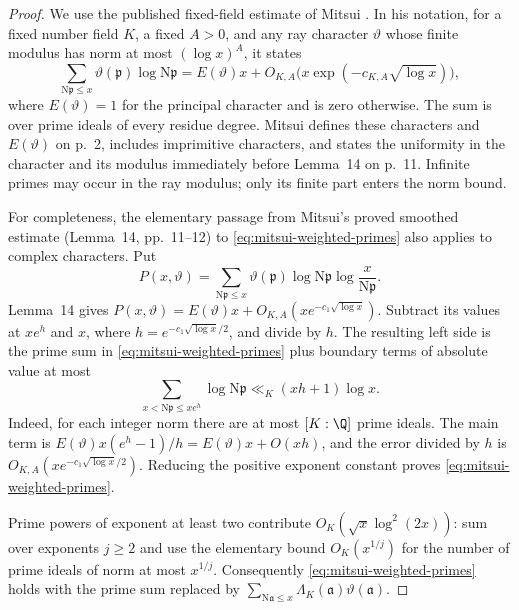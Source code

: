 \begin{proof}
We use the published fixed-field estimate of Mitsui
\cite[\S1, Lemma~15, p.~12]{Mitsui1956}.
In his notation, for a fixed number field $K$, a fixed $A>0$, and any
ray character $\vartheta$ whose finite modulus has norm at most
$(\log x)^A$, it states
\begin{equation}\label{eq:mitsui-weighted-primes}
 \sum_{\mathrm N\mathfrak p\leq x}
       \vartheta(\mathfrak p)\log\mathrm N\mathfrak p
 =E(\vartheta)x+
 O_{K,A}\bigl(x\exp(-c_{K,A}\sqrt{\log x})\bigr),
\end{equation}
where $E(\vartheta)=1$ for the principal character and is zero otherwise.
The sum is over prime ideals of every residue degree.
Mitsui defines these characters and $E(\vartheta)$ on p.~2, includes
imprimitive characters, and states the uniformity in the character
and its modulus immediately before Lemma~14 on p.~11.
Infinite primes may occur in the ray modulus; only its finite part
enters the norm bound.

For completeness, the elementary passage from Mitsui's proved
smoothed estimate (Lemma~14, pp.~11--12) to
\eqref{eq:mitsui-weighted-primes} also applies to complex characters.
Put
\[
 P(x,\vartheta)=\sum_{\mathrm N\mathfrak p\leq x}
  \vartheta(\mathfrak p)\log\mathrm N\mathfrak p
                         \log\frac{x}{\mathrm N\mathfrak p}.
\]
Lemma~14 gives $P(x,\vartheta)=E(\vartheta)x+
O_{K,A}(xe^{-c_1\sqrt{\log x}})$.
Subtract its values at $xe^h$ and $x$, where
$h=e^{-c_1\sqrt{\log x}/2}$, and divide by $h$.
The resulting left side is the prime sum in
\eqref{eq:mitsui-weighted-primes} plus boundary terms of absolute
value at most
\[
 \sum_{x<\mathrm N\mathfrak p\leq xe^h}\log\mathrm N\mathfrak p
       \ll_K(xh+1)\log x.
\]
Indeed, for each integer norm there are at most $[K:\Q]$ prime ideals.
The main term is $E(\vartheta)x(e^h-1)/h=E(\vartheta)x+O(xh)$,
and the error divided by $h$ is
$O_{K,A}(xe^{-c_1\sqrt{\log x}/2})$.
Reducing the positive exponent constant proves
\eqref{eq:mitsui-weighted-primes}.

Prime powers of exponent at least two contribute
$O_K(\sqrt x\log^2(2x))$: sum over exponents $j\geq2$ and use the
elementary bound $O_K(x^{1/j})$ for the number of prime ideals of norm
at most $x^{1/j}$.
Consequently \eqref{eq:mitsui-weighted-primes} holds with the prime
sum replaced by
$\sum_{\mathrm N\mathfrak a\leq x}
\Lambda_K(\mathfrak a)\vartheta(\mathfrak a)$.


\end{proof}
